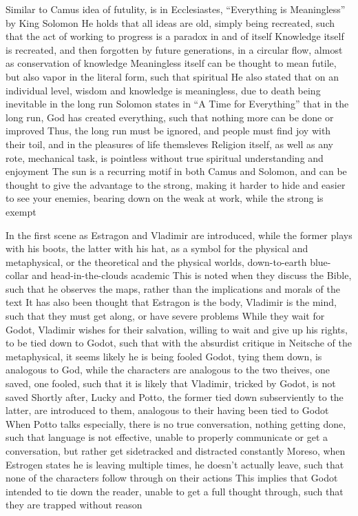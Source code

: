 \1 Similar to Camus idea of futulity, is in Ecclesiastes, ``Everything is Meaningless'' by King Solomon
\2 He holds that all ideas are old, simply being recreated, such that the act of working to progress is a paradox in and of itself
\3 Knowledge itself is recreated, and then forgotten by future generations, in a circular flow, almost as conservation of knowledge
\2 Meaningless itself can be thought to mean futile, but also vapor in the literal form, such that spiritual 
\2 He also stated that on an individual level, wisdom and knowledge is meaningless, due to death being inevitable in the long run
\1 Solomon states in ``A Time for Everything'' that in the long run, God has created everything, such that nothing more can be done or improved
\2 Thus, the long run must be ignored, and people must find joy with their toil, and in the pleasures of life themsleves
\2 Religion itself, as well as any rote, mechanical task, is pointless without true spiritual understanding and enjoyment
\1 The sun is a recurring motif in both Camus and Solomon, and can be thought to give the advantage to the strong, making it harder to hide and easier to see your enemies, bearing down on the weak at work, while the strong is exempt


\1 In the first scene as Estragon and Vladimir are introduced, while the former plays with his boots, the latter with his hat, as a symbol for the physical and metaphysical, or the theoretical and the physical worlds, down-to-earth blue-collar and head-in-the-clouds academic
\2 This is noted when they discuss the Bible, such that he observes the maps, rather than the implications and morals of the text
\2 It has also been thought that Estragon is the body, Vladimir is the mind, such that they must get along, or have severe problems
\1 While they wait for Godot, Vladimir wishes for their salvation, willing to wait and give up his rights, to be tied down to Godot, such that with the absurdist critique in Neitsche of the metaphysical, it seems likely he is being fooled
\2 Godot, tying them down, is analogous to God, while the characters are analogous to the two theives, one saved, one fooled, such that it is likely that Vladimir, tricked by Godot, is not saved
\2 Shortly after, Lucky and Potto, the former tied down subserviently to the latter, are introduced to them, analogous to their having been tied to Godot
\1 When Potto talks especially, there is no true conversation, nothing getting done, such that language is not effective, unable to properly communicate or get a conversation, but rather get sidetracked and distracted constantly
\2 Moreso, when Estrogen states he is leaving multiple times, he doesn't actually leave, such that none of the characters follow through on their actions
\2 This implies that Godot intended to tie down the reader, unable to get a full thought through, such that they are trapped without reason
